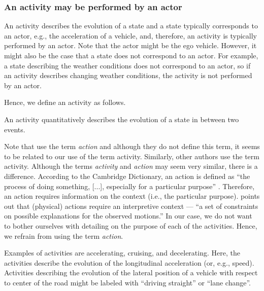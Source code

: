 \subsubsection{An activity may be performed by an actor}
An activity describes the evolution of a state and a state typically corresponds to an actor, e.g., the acceleration of a vehicle, and, therefore, an activity is typically performed by an actor. Note that the actor might be the ego vehicle. However, it might also be the case that a state does not correspond to an actor. For example, a state describing the weather conditions does not correspond to an actor, so if an activity describes changing weather conditions, the activity is not performed by an actor.

Hence, we define an activity as follows.
\begin{definition}[Activity]
	An activity quantitatively describes the evolution of a state in between two events.
\end{definition}


Note that \textcite{geyer2014, ulbrich2015} use the term \emph{action} and although they do not define this term, it seems to be related to our use of the term activity. Similarly, other authors \cite{sigsim2019glossary, catapult2018musicc, elrofai2018scenario} use the term activity. Although the terms \emph{activity} and \emph{action} may seem very similar, there is a difference. According to the Cambridge Dictionary, an action is defined as ``the process of doing something, [...], especially for a particular purpose'' \cite{cambridge2019action}. Therefore, an action requires information on the context (i.e., the particular purpose). \textcite{bobick1997movement} points out that (physical) actions require an interpretive context --- ``a set of constraints on possible explanations for the observed motions.'' In our case, we do not want to bother ourselves with detailing on the purpose of each of the activities. Hence, we refrain from using the term \emph{action}.

Examples of activities are accelerating, cruising, and decelerating. Here, the activities describe the evolution of the longitudinal acceleration (or, e.g., speed). Activities describing the evolution of the lateral position of a vehicle with respect to center of the road might be labeled with ``driving straight'' or ``lane change''.
\cbend



